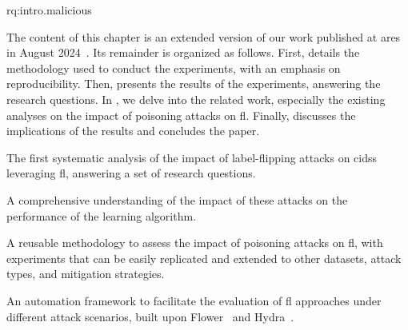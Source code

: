 \begin{subquestions}{rq:intro.malicious}
  \item \rqpred \label{rq:assess.predictability}
  \item \rqparams \label{rq:assess.hyperparams}
  \item \rqbackdoor \label{rq:assess.backdoors}
  \item \rqthreshold \label{rq:assess.threshold}
  \item \rqsim \label{rq:assess.similarity}
\end{subquestions}

The content of this chapter is an extended version of our work published at \gls{ares} in August 2024~\cite{lavaur_ares_bass_2024}.
Its remainder is organized as follows.
First,  details the methodology used to conduct the experiments, with an emphasis on reproducibility.
Then,  presents the results of the experiments, answering the research questions.
In , we delve into the related work, especially the existing analyses on the impact of poisoning attacks on \gls{fl}.
Finally,  discusses the implications of the results and concludes the paper.


\begin{contribs}
  \item The first systematic analysis of the impact of label-flipping attacks on \glspl{cids} leveraging \gls{fl}, answering a set of research questions.
  \item A comprehensive understanding of the impact of these attacks on the performance of the learning algorithm.
  \item A reusable methodology to assess the impact of poisoning attacks on \gls{fl}, with experiments that can be easily replicated and extended to other datasets, attack types, and mitigation strategies.
  \item An automation framework to facilitate the evaluation of \gls{fl} approaches under different attack scenarios, built upon Flower~\cite{beutel_Flowerfriendlyfederated_2020} and Hydra~\cite{Hydra}.
\end{contribs}